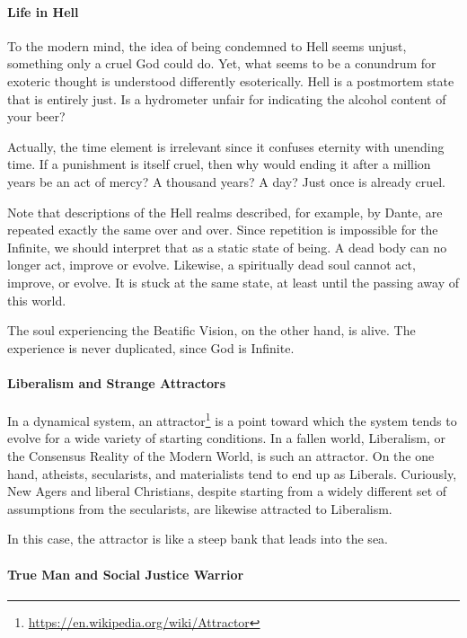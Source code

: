 \paragraph{Life in Hell}


To the modern mind, the idea of being condemned to Hell seems unjust, something only a cruel God could do. Yet, what seems to be a conundrum for exoteric thought is understood differently esoterically. Hell is a postmortem state that is entirely just. Is a hydrometer unfair for indicating the alcohol content of your beer?

Actually, the time element is irrelevant since it confuses eternity with unending time. If a punishment is itself cruel, then why would ending it after a million years be an act of mercy? A thousand years? A day? Just once is already cruel.

Note that descriptions of the Hell realms described, for example, by Dante, are repeated exactly the same over and over. Since repetition is impossible for the Infinite, we should interpret that as a static state of being. A dead body can no longer act, improve or evolve. Likewise, a spiritually dead soul cannot act, improve, or evolve. It is stuck at the same state, at least until the passing away of this world.

The soul experiencing the Beatific Vision, on the other hand, is alive. The experience is never duplicated, since God is Infinite.

\paragraph{Liberalism and Strange Attractors}


In a dynamical system, an attractor\footnote{\url{https://en.wikipedia.org/wiki/Attractor}} is a point toward which the system tends to evolve for a wide variety of starting conditions. In a fallen world, Liberalism, or the Consensus Reality of the Modern World, is such an attractor. On the one hand, atheists, secularists, and materialists tend to end up as Liberals. Curiously, New Agers and liberal Christians, despite starting from a widely different set of assumptions from the secularists, are likewise attracted to Liberalism.

In this case, the attractor is like a steep bank that leads into the sea.

\paragraph{True Man and Social Justice Warrior}


